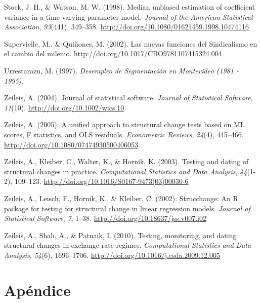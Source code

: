 \documentclass[12pt,oneside]{reedthesis}
\begin{document}
\leavevmode\hypertarget{ref-Stock1998}{}%
Stock, J. H., \& Watson, M. W. (1998). Median unbiased estimation of coefficient variance in a time-varying parameter model. \emph{Journal of the American Statistical Association}, \emph{93}(441), 349--358. \url{http://doi.org/10.1080/01621459.1998.10474116}

\leavevmode\hypertarget{ref-Quinones2001}{}%
Supervielle, M., \& Quiñones, M. (2002). Las nuevas funciones del Sindicalismo en el cambio del milenio. \url{http://doi.org/10.1017/CBO9781107415324.004}

\leavevmode\hypertarget{ref-Urrestarazu1997}{}%
Urrestarazu, M. (1997). \emph{Desempleo de Segmentación en Montevideo (1981 - 1995)}.

\leavevmode\hypertarget{ref-Zeileis2004}{}%
Zeileis, A. (2004). Journal of statistical software. \emph{Journal of Statistical Software}, \emph{11}(10). \url{http://doi.org/10.1002/wics.10}

\leavevmode\hypertarget{ref-Zeileis2005}{}%
Zeileis, A. (2005). A unified approach to structural change tests based on ML scores, F statistics, and OLS residuals. \emph{Econometric Reviews}, \emph{24}(4), 445--466. \url{http://doi.org/10.1080/07474930500406053}

\leavevmode\hypertarget{ref-Zeileis2003}{}%
Zeileis, A., Kleiber, C., Walter, K., \& Hornik, K. (2003). Testing and dating of structural changes in practice. \emph{Computational Statistics and Data Analysis}, \emph{44}(1-2), 109--123. \url{http://doi.org/10.1016/S0167-9473(03)00030-6}

\leavevmode\hypertarget{ref-Zeileis2002}{}%
Zeileis, A., Leisch, F., Hornik, K., \& Kleiber, C. (2002). Strucchange: An R package for testing for structural change in linear regression models. \emph{Journal of Statistical Software}, \emph{7}, 1--38. \url{http://doi.org/10.18637/jss.v007.i02}

\leavevmode\hypertarget{ref-Zeileis2010}{}%
Zeileis, A., Shah, A., \& Patnaik, I. (2010). Testing, monitoring, and dating structural changes in exchange rate regimes. \emph{Computational Statistics and Data Analysis}, \emph{54}(6), 1696--1706. \url{http://doi.org/10.1016/j.csda.2009.12.005}

\appendix

\setlength{\parindent}{0.20in}
\setlength{\leftskip}{-0.20in}
\setlength{\parskip}{8pt}

\hypertarget{apuxe9ndice}{%
\chapter{Apéndice}\label{apuxe9ndice}}
\end{document}
